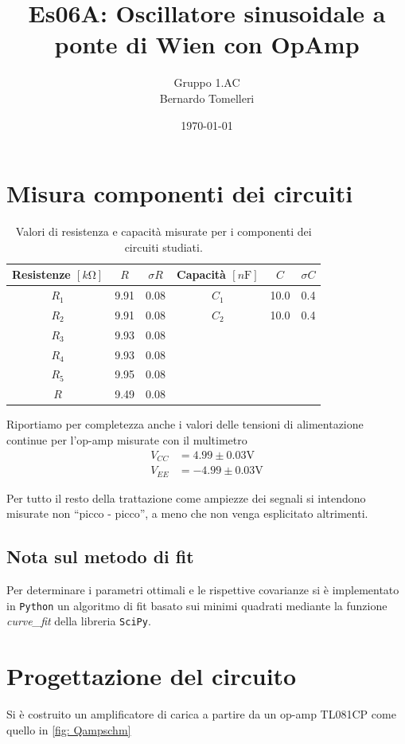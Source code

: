 \documentclass[10pt, a4paper, italian]{article}
\author{Gruppo 1.AC \\ Bernardo Tomelleri}
\title{Es06A: Oscillatore sinusoidale a ponte di Wien con OpAmp}
\begin{document}
\date{\today}
\maketitle

\setcounter{section}{0}

\section*{Misura componenti dei circuiti}
\begin{table}[htbp]
\centering
\begin{tabular}{cccccc}
\toprule
Resistenze $[\si{k\ohm}]$ & $R$ & $\sigma R$ & Capacità $[\si{n\F}]$ & $C$ &
$\sigma C$ \\
\midrule
\midrule
$R_1$	  & 9.91	& 0.08	 & $C_1$ & 10.0		 & 0.4 \\
$R_2$	  & 9.91	& 0.08 	 & $C_2$ & 10.0		 & 0.4 \\
$R_3$	  & 9.93	& 0.08	 & & & \\
$R_4$	  & 9.93	& 0.08	 & & & \\
$R_5$	  & 9.95	& 0.08	 & & & \\
$R$		  & 9.49	& 0.08	 & & & \\
\bottomrule     
\end{tabular}
\caption{Valori di resistenza e capacità misurate per i componenti dei
circuiti studiati. \label{tab: rcmes}}
\end{table}

Riportiamo per completezza anche i valori delle tensioni di alimentazione
continue per l'op-amp misurate con il multimetro
\begin{align*}
V_{CC} &= 4.99 \pm 0.03 \si{\V} \\
V_{EE} &= -4.99 \pm 0.03 \si{\V}
\end{align*}

Per tutto il resto della trattazione come ampiezze dei segnali si intendono
misurate non ``picco - picco'', a meno che non venga esplicitato altrimenti.

\subsection*{Nota sul metodo di fit}
Per determinare i parametri ottimali e le rispettive covarianze si \`e
implementato in \verb+Python+ un algoritmo di fit basato sui minimi quadrati
mediante la funzione \emph{curve\_fit} della libreria \texttt{SciPy}.

\section{Progettazione del circuito}
Si è costruito un amplificatore di carica a partire da un op-amp TL081CP come
quello in \cref{fig: Qampschm}
\end{document}
